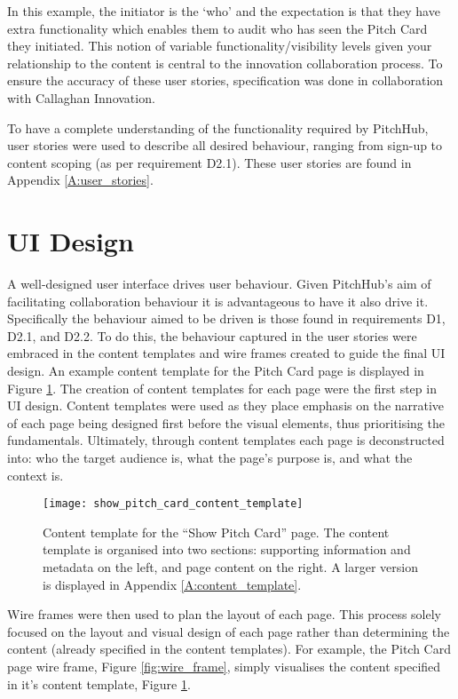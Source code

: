 In this example, the initiator is the `who' and the expectation is that they have extra functionality which enables them to audit who has seen the Pitch Card they initiated. This notion of variable functionality/visibility levels given your relationship to the content is central to the innovation collaboration process. To ensure the accuracy of these user stories, specification was done in collaboration with Callaghan Innovation. 

To have a complete understanding of the functionality required by PitchHub, user stories were used to describe all desired behaviour, ranging from sign-up to content scoping (as per requirement D2.1). These user stories are found in Appendix \ref{A:user_stories}.


\section{UI Design}
A well-designed user interface drives user behaviour. Given PitchHub's aim of facilitating collaboration behaviour it is advantageous to have it also drive it. Specifically the behaviour aimed to be driven is those found in requirements D1, D2.1, and D2.2. To do this, the behaviour captured in the user stories were embraced in the content templates and wire frames created to guide the final UI design. An example content template for the Pitch Card page is displayed in Figure \ref{fig:content_template}.
The creation of content templates for each page were the first step in UI design. Content templates were used as they place emphasis on the narrative of each page being designed first before the visual elements, thus prioritising the fundamentals. Ultimately, through content templates each page is deconstructed into: who the target audience is, what the page's purpose is, and what the context is.

\begin{figure}[ht]
    \centering
    \texttt{[image: show\_pitch\_card\_content\_template]}
    \caption{Content template for the ``Show Pitch Card'' page. The content template is organised into two sections: supporting information and metadata on the left, and page content on the right. A larger version is displayed in Appendix \ref{A:content_template}.}
    \label{fig:content_template}
\end{figure}

Wire frames were then used to plan the layout of each page. This process solely focused on the layout and visual design of each page rather than determining the content (already specified in the content templates). For example, the Pitch Card page wire frame, Figure \ref{fig:wire_frame}, simply visualises the content specified in it's content template, Figure \ref{fig:content_template}.

